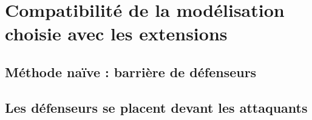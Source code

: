 \documentclass{article}
\begin{document}

\section{Compatibilité de la modélisation choisie avec les extensions}


\subsection{Méthode naïve : barrière de défenseurs}

\subsection{Les défenseurs se placent devant les attaquants}
\end{document}
